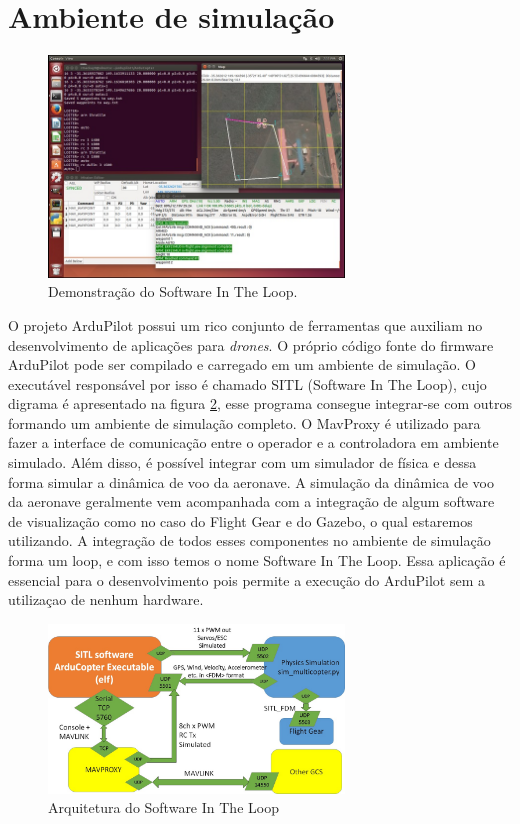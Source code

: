 \documentclass[12pt,a4paper,oneside]{book}
\begin{document}
\section{Ambiente de simulação}
%
\begin{figure}[!htbp]
  \centering
  \includegraphics[width=0.7\textwidth]{Images/Desenvolvimento/sitl_demo.jpg}
  \caption{Demonstração do Software In The Loop.}
  \label{fig:sitl_demo.jpg.0}
\end{figure}
%

O projeto ArduPilot possui um rico conjunto de ferramentas que auxiliam no desenvolvimento de aplicações para \textit{drones}. O próprio código fonte do firmware ArduPilot pode ser compilado e carregado em um ambiente de simulação. O executável responsável por isso é chamado SITL (Software In The Loop), cujo digrama é apresentado na figura \ref{fig:sitl_arq.jpg.0}, esse programa consegue integrar-se com outros formando um ambiente de simulação completo. O MavProxy é utilizado para fazer a interface de comunicação entre o operador e a controladora em ambiente simulado. Além disso, é possível integrar com um simulador de física e dessa forma simular a dinâmica de voo da aeronave. A simulação da dinâmica de voo da aeronave geralmente vem acompanhada com a integração de algum software de visualização como no caso do Flight Gear e do Gazebo, o qual estaremos utilizando. A integração de todos esses componentes no ambiente de simulação forma um loop, e com isso temos o nome Software In The Loop. Essa aplicação é essencial para o desenvolvimento pois permite a execução do ArduPilot sem a utilizaçao de nenhum hardware.

%
\begin{figure}[H]
  \centering
  \includegraphics[width=0.7\textwidth]{Images/Diagramas/sitl_arq.jpg}
  \caption{Arquitetura do Software In The Loop}
  \label{fig:sitl_arq.jpg.0}
\end{figure}
%
\end{document}
